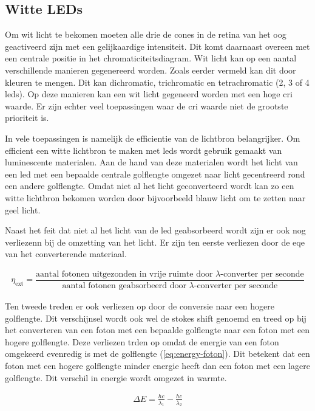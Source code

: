\subsection{Witte LEDs}\label{sec:witte-leds}

Om wit licht te bekomen moeten alle drie de cones in de retina van het oog geactiveerd zijn met een gelijkaardige intensiteit. Dit komt daarnaast overeen met een centrale positie in het chromaticiteitsdiagram. Wit licht kan op een aantal verschillende manieren gegenereerd worden. Zoals eerder vermeld kan dit door kleuren te mengen. Dit kan dichromatic, trichromatic en tetrachromatic (2, 3 of 4 \gls{led}s). Op deze manieren kan een wit licht gegeneerd worden met een hoge \gls{cri} waarde. Er zijn echter veel toepassingen waar de \gls{cri} waarde niet de grootste prioriteit is.

In vele toepassingen is namelijk de efficientie van de lichtbron belangrijker. Om efficient een witte lichtbron te maken met \gls{led}s wordt gebruik gemaakt van luminescente materialen. Aan de hand van deze materialen wordt het licht van een \gls{led} met een bepaalde centrale golflengte omgezet naar licht gecentreerd rond een andere golflengte. Omdat niet al het licht geconverteerd wordt kan zo een witte lichtbron bekomen worden door bijvoorbeeld blauw licht om te zetten naar geel licht.

Naast het feit dat niet al het licht van de \gls{led} geabsorbeerd wordt zijn er ook nog verliezenn bij de omzetting van het licht. Er zijn ten eerste verliezen door de \gls{eqe} van het converterende materiaal.

\begin{align}
\eta_{\text{ext}} = \dfrac{\text{aantal fotonen uitgezonden in vrije ruimte door }\lambda\text{-converter per seconde}}{\text{aantal fotonen geabsorbeerd door }\lambda\text{-converter per seconde}}
\end{align}

Ten tweede treden er ook verliezen op door de conversie naar een hogere golflengte. Dit verschijnsel wordt ook wel de stokes shift genoemd en treed op bij het converteren van een foton met een bepaalde golflengte naar een foton met een hogere golflengte. Deze verliezen trden op omdat de energie van een foton omgekeerd evenredig is met de golflengte (\cref{eq:energy-foton}). Dit betekent dat een foton met een hogere golflengte minder energie heeft dan een foton met een lagere golflengte. Dit verschil in energie wordt omgezet in warmte.

\begin{align}
\Delta E = \frac{hc}{\lambda_1} - \frac{hc}{\lambda_2}
\end{align}

